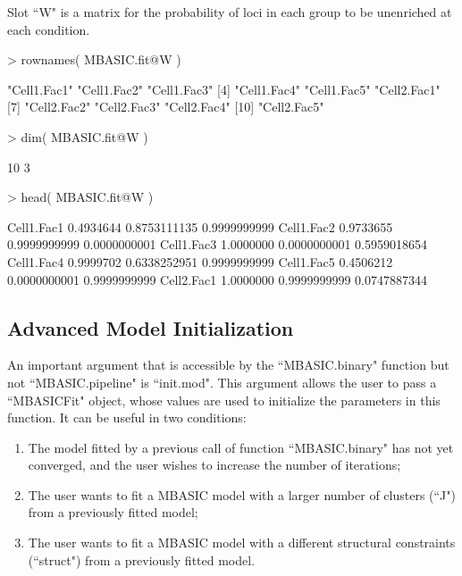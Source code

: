 \documentclass[a4paper,10pt]{article}
\begin{document}
Slot ``W" is a matrix for the probability of loci in each group to be unenriched at each condition.

\begin{Schunk}
\begin{Sinput}
> rownames( MBASIC.fit@W )
\end{Sinput}
\begin{Soutput}
 [1] "Cell1.Fac1" "Cell1.Fac2" "Cell1.Fac3"
 [4] "Cell1.Fac4" "Cell1.Fac5" "Cell2.Fac1"
 [7] "Cell2.Fac2" "Cell2.Fac3" "Cell2.Fac4"
[10] "Cell2.Fac5"
\end{Soutput}
\begin{Sinput}
> dim( MBASIC.fit@W )
\end{Sinput}
\begin{Soutput}
[1] 10  3
\end{Soutput}
\begin{Sinput}
> head( MBASIC.fit@W )
\end{Sinput}
\begin{Soutput}
                [,1]         [,2]         [,3]
Cell1.Fac1 0.4934644 0.8753111135 0.9999999999
Cell1.Fac2 0.9733655 0.9999999999 0.0000000001
Cell1.Fac3 1.0000000 0.0000000001 0.5959018654
Cell1.Fac4 0.9999702 0.6338252951 0.9999999999
Cell1.Fac5 0.4506212 0.0000000001 0.9999999999
Cell2.Fac1 1.0000000 0.9999999999 0.0747887344
\end{Soutput}
\end{Schunk}

\subsection{Advanced Model Initialization}

An important argument that is accessible by the ``MBASIC.binary" function but not ``MBASIC.pipeline" is ``init.mod". This argument allows the user to pass a ``MBASICFit" object, whose values are used to initialize the parameters in this function. It can be useful in two conditions:

\begin{enumerate}
\item The model fitted by a previous call of function ``MBASIC.binary" has not yet converged, and the user wishes to increase the number of iterations;
\item The user wants to fit a MBASIC model with a larger number of clusters (``J")  from a previously fitted model;
\item The user wants to fit a MBASIC model with a different structural constraints (``struct") from a previously fitted model.
\end{enumerate}
\end{document}
